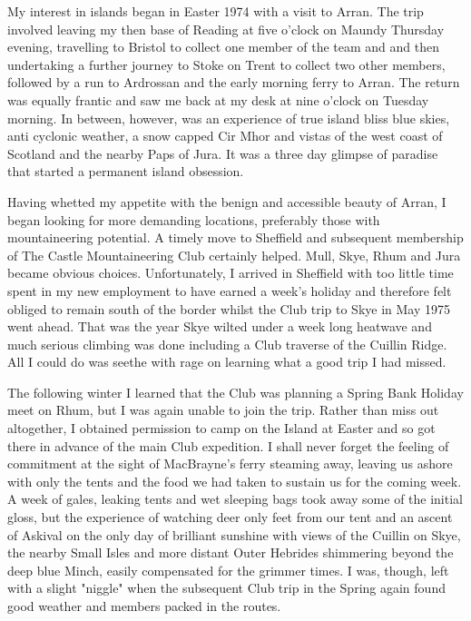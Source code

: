 \documentclass[a5paper,openany,font 10pt]{scrbook}
\begin{document}
My interest in islands began in Easter 1974 with a visit to Arran. The
trip involved leaving my then base of Reading at five o'clock on
Maundy Thursday evening, travelling to Bristol to collect one member
of the team and and then undertaking a further journey to Stoke on
Trent to collect two other members, followed by a run to Ardrossan and
the early morning ferry to Arran. The return was equally frantic and
saw me back at my desk at nine o'clock on Tuesday morning. In between,
however, was an experience of true island bliss blue skies, anti
cyclonic weather, a snow capped Cir Mhor and vistas of the west coast
of Scotland and the nearby Paps of Jura. It was a three day glimpse of
paradise that started a permanent island obsession.

Having whetted my appetite with the benign and accessible beauty of
Arran, I began looking for more demanding locations, preferably those
with mountaineering potential. A timely move to Sheffield and
subsequent membership of The Castle Mountaineering Club certainly
helped. Mull, Skye, Rhum and Jura became obvious
choices. Unfortunately, I arrived in Sheffield with too little time
spent in my new employment to have earned a week's holiday and
therefore felt obliged to remain south of the border whilst the Club
trip to Skye in May 1975 went ahead. That was the year Skye wilted
under a week long heatwave and much serious climbing was done
including a Club traverse of the Cuillin Ridge. All I could do was
seethe with rage on learning what a good trip I had missed.

The following winter I learned that the Club was planning a Spring
Bank Holiday meet on Rhum, but I was again unable to join the
trip. Rather than miss out altogether, I obtained permission to camp
on the Island at Easter and so got there in advance of the main Club
expedition. I shall never forget the feeling of commitment at the
sight of MacBrayne's ferry steaming away, leaving us ashore with only
the tents and the food we had taken to sustain us for the coming
week. A week of gales, leaking tents and wet sleeping bags took away
some of the initial gloss, but the experience of watching deer only
feet from our tent and an ascent of Askival on the only day of
brilliant sunshine with views of the Cuillin on Skye, the nearby Small
Isles and more distant Outer Hebrides shimmering beyond the deep blue
Minch, easily compensated for the grimmer times. I was, though, left
with a slight "niggle" when the subsequent Club trip in the Spring
again found good weather and members packed in the routes.
\end{document}
